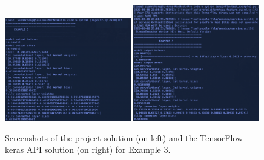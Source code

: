 \documentclass[12pt]{amsart}
\begin{document}
\begin{figure}[h!]
\includegraphics[height=0.33\textheight, width=0.49\textwidth]{ex3_proj.png}
\includegraphics[height=0.33\textheight, width=0.49\textwidth]{ex3_tf.png}
\caption{Screenshots of the project solution (on left) and the TensorFlow keras API solution (on right) for Example 3.}
\end{figure}
\end{document}
